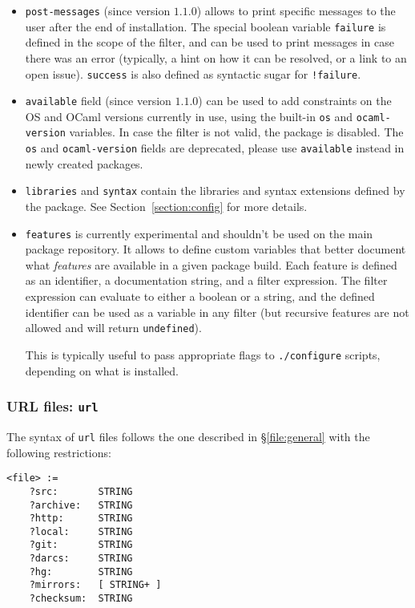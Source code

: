 \documentclass[a4paper,10pt]{article}
\begin{document}
\begin{itemize}
\item {\tt post-messages} (since version $1.1.0$) allows to print
  specific messages to the user after the end of installation. The special
  boolean variable \verb+failure+ is defined in the scope of the filter, and can
  be used to print messages in case there was an error (typically, a hint on how
  it can be resolved, or a link to an open issue). \verb+success+ is also
  defined as syntactic sugar for \verb+!failure+.

\item {\tt available} field (since version $1.1.0$) can be used to add
  constraints on the OS and OCaml versions currently in use, using the built-in
  \verb+os+ and \verb+ocaml-version+ variables. In case the filter is not valid,
  the package is disabled. The {\tt os} and {\tt ocaml-version} fields are
  deprecated, please use {\tt available} instead in newly created packages.

\item {\tt libraries} and {\tt syntax} contain the
  libraries and syntax extensions defined by the package. See
  Section~\ref{section:config} for more details.

\item {\tt features} is currently experimental and shouldn't be used on the main
  package repository. It allows to define custom variables that better document
  what {\em features} are available in a given package build. Each feature is
  defined as an identifier, a documentation string, and a filter expression. The
  filter expression can evaluate to either a boolean or a string, and the
  defined identifier can be used as a variable in any filter (but recursive
  features are not allowed and will return {\tt undefined}).

  This is typically useful to pass appropriate flags to {\tt ./configure}
  scripts, depending on what is installed.
\end{itemize}

\subsubsection{URL files: {\tt url}}
\label{file:url}

The syntax of {\tt url} files follows the one described in
\S\ref{file:general} with the following restrictions:

\begin{Verbatim}
<file> :=
    ?src:       STRING
    ?archive:   STRING
    ?http:      STRING
    ?local:     STRING
    ?git:       STRING
    ?darcs:     STRING
    ?hg:        STRING
    ?mirrors:   [ STRING+ ]
    ?checksum:  STRING
\end{Verbatim}
\end{document}
